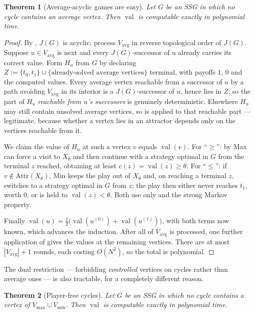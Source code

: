 \documentclass[11pt]{article}
\theoremstyle{plain}
\newtheorem{theorem}{Theorem}[section]
\theoremstyle{definition}
\DeclareMathOperator{\val}{val}
\newcommand{\Vmax}{V_{\max}}
\newcommand{\Vmin}{V_{\min}}
\newcommand{\Vavg}{V_{\mathrm{avg}}}
\begin{document}
\begin{theorem}[Average-acyclic games are easy]\label{thm:avg-acyclic}
Let $G$ be an SSG in which no cycle contains an average vertex. Then
$\val$ is computable exactly in polynomial time.
\end{theorem}

\begin{proof}
By , $J(G)$ is acyclic; process $\Vavg$ in reverse
topological order of $J(G)$. Suppose $u\in\Vavg$ is next and every
$J(G)$-successor of $u$ already carries its correct value. Form $H_u$
from $G$ by declaring
$Z:=\{t_0,t_1\}\cup\{\text{already-solved average vertices}\}$ terminal,
with payoffs $1$, $0$ and the computed values. Every average vertex
reachable from a successor of $u$ by a path avoiding $\Vavg$ in its
interior is a $J(G)$-successor of $u$, hence lies in $Z$; so the part of
$H_u$ \emph{reachable from $u$'s successors} is genuinely deterministic.
Elsewhere $H_u$ may still contain unsolved average vertices, so
 is applied to that reachable part --- legitimate,
because whether a vertex lies in an attractor depends only on the
vertices reachable from it.

We claim the value of $H_u$ at such a vertex $v$ equals $\val(v)$. For
``$\ge$'': by  Max can force a visit to $X_\theta$ and
then continue with a strategy optimal in $G$ from the terminal $z$
reached, obtaining at least $c(z)=\val(z)\ge\theta$. For ``$\le$'': if
$v\notin\mathrm{Attr}(X_\theta)$, Min keeps the play out of $X_\theta$ and,
on reaching a terminal $z$, switches to a strategy optimal in $G$ from
$z$; the play then either never reaches $t_1$, worth $0$, or is held to
$\val(z)<\theta$. Both use only  and the strong
Markov property.

Finally $\val(u)=\tfrac12\bigl(\val(u^{(0)})+\val(u^{(1)})\bigr)$, with
both terms now known, which advances the induction. After all of $\Vavg$
is processed, one further application of  gives the
values at the remaining vertices. There are at most $|\Vavg|+1$ rounds,
each costing $O(N^{2})$, so the total is polynomial.
\end{proof}

The dual restriction --- forbidding \emph{controlled} vertices on cycles
rather than average ones --- is also tractable, for a completely
different reason.

\begin{theorem}[Player-free cycles]\label{thm:player-free}
Let $G$ be an SSG in which no cycle contains a vertex of
$\Vmax\cup\Vmin$. Then $\val$ is computable exactly in polynomial time.
\end{theorem}
\end{document}
